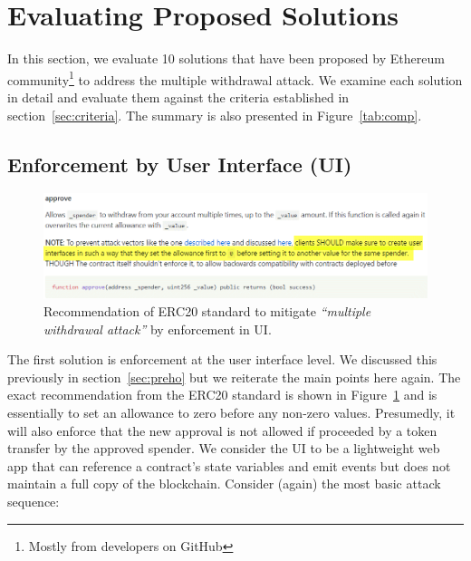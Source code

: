 
\section{Evaluating Proposed Solutions}\label{sec:eval}

In this section, we evaluate 10 solutions that have been proposed by Ethereum community\footnote{Mostly from developers on GitHub} to address the multiple withdrawal attack. We examine each solution in detail and evaluate them against the criteria established in section~\ref{sec:criteria}. The summary is also presented in Figure~\ref{tab:comp}.


\subsection{Enforcement by User Interface (UI)}\label{sec:enfui}

\begin{figure}[t!]
	\centering
	\includegraphics[width=1.0\linewidth]{figures/multiple_withdrawal_03.png}
	\caption{Recommendation of ERC20 standard to mitigate \textit{``multiple withdrawal attack''} by enforcement in UI.\label{fig:uie}}
\end{figure}

The first solution is enforcement at the user interface level. We discussed this previously in section~\ref{sec:preho} but we reiterate the main points here again. The exact recommendation from the ERC20 standard is shown in Figure~\ref{fig:uie} and is essentially to set an allowance to zero before any non-zero values. Presumedly, it will also enforce that the new approval is not allowed if proceeded by a token transfer by the approved spender. We consider the UI to be a lightweight web app that can reference a contract's state variables and emit events but does not maintain a full copy of the blockchain. Consider (again) the most basic attack sequence:

